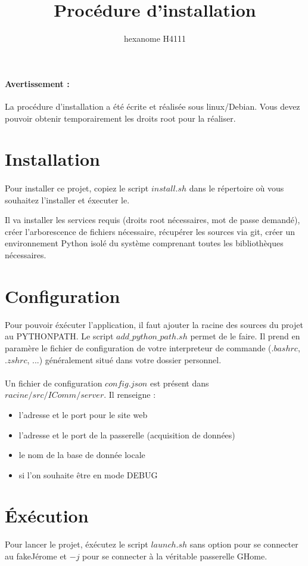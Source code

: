 \documentclass[10pt,a4paper]{article}
\author{hexanome H4111}
\title{Procédure d'installation}
\begin{document}
\paragraph{Avertissement : }La procédure d'installation a été écrite et réalisée sous linux/Debian. Vous devez pouvoir obtenir temporairement les droits root pour la réaliser.
\section{Installation}
\paragraph{} Pour installer ce projet, copiez le script $install.sh$ dans le répertoire où vous souhaitez l'installer et éxecuter le.

Il va installer les services requis (droits root nécessaires, mot de passe demandé), créer l'arborescence de fichiers nécessaire, récupérer les sources via git, créer un environnement Python isolé du système comprenant toutes les bibliothèques nécessaires.

\section{Configuration}
Pour pouvoir éxécuter l'application, il faut ajouter la racine des sources du projet au PYTHONPATH. Le script $add\_python\_path.sh$ permet de le faire. Il prend en paramère le fichier de configuration de votre interpreteur de commande ($.bashrc$,$.zshrc$, ...) généralement situé dans votre dossier personnel.
\paragraph{} Un fichier de configuration $config.json$ est présent dans $racine/src/IComm/server$. Il renseigne  : 
\begin{itemize}
\item l'adresse et le port pour le site web
\item l'adresse et le port de la passerelle (acquisition de données)
\item le nom de la base de donnée locale
\item si l'on souhaite être en mode DEBUG
\end{itemize}
\section{\'{E}xécution}
Pour lancer le projet, éxécutez le script $launch.sh$ sans option pour se connecter au fakeJérome et $-j$ pour se connecter à la véritable passerelle GHome.
\end{document}
